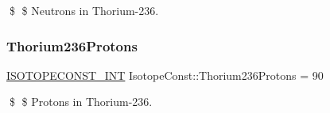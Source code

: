 \$ \$ Neutrons in Thorium-\/236. \mbox{\label{group___isotope_const-_thorium-_th236_gac0cf2519b1bd1f60da8381ca141f2c15}} 
\subsubsection{\texorpdfstring{Thorium236\+Protons}{Thorium236Protons}}
{\footnotesize\ttfamily \mbox{\hyperlink{group___isotope_const-_macros_ga5f18360b3e99483a35c32d789e62621c}{I\+S\+O\+T\+O\+P\+E\+C\+O\+N\+S\+T\+\_\+\+I\+NT}} Isotope\+Const\+::\+Thorium236\+Protons = 90}

\$ \$ Protons in Thorium-\/236. 